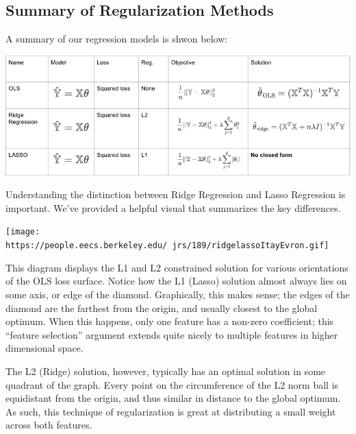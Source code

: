 \documentclass[
  letterpaper,
  DIV=11,
  numbers=noendperiod]{scrreprt}
\begin{document}
\hypertarget{summary-of-regularization-methods}{%
\subsection{Summary of Regularization
Methods}\label{summary-of-regularization-methods}}

A summary of our regression models is shwon below:

\includegraphics{cv_regularization/images/reg_models_sum.png}

Understanding the distinction between Ridge Regression and Lasso
Regression is important. We've provided a helpful visual that summarizes
the key differences.

\texttt{[image: https://people.eecs.berkeley.edu/~jrs/189/ridgelassoItayEvron.gif]}

This diagram displays the L1 and L2 constrained solution for various
orientations of the OLS loss surface. Notice how the L1 (Lasso) solution
almost always lies on some axis, or edge of the diamond. Graphically,
this makes sense; the edges of the diamond are the farthest from the
origin, and usually closest to the global optimum. When this happens,
only one feature has a non-zero coefficient; this ``feature selection''
argument extends quite nicely to multiple features in higher dimensional
space.

The L2 (Ridge) solution, however, typically has an optimal solution in
some quadrant of the graph. Every point on the circumference of the L2
norm ball is equidistant from the origin, and thus similar in distance
to the global optimum. As such, this technique of regularization is
great at distributing a small weight across both features.
\end{document}
